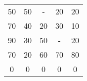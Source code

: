 \begin{tabular}{ccccc}
50     & 50     & -      & 20     & 20 \\
70     & 40     & 20     & 30     & 10 \\
90     & 30     & 50     & -      & 20 \\
70     & 20     & 60     & 70     & 80 \\
0      & 0      & 0      & 0      & 0 \bigstrut[b]\\
\hline
\hline
\end{tabular}%
